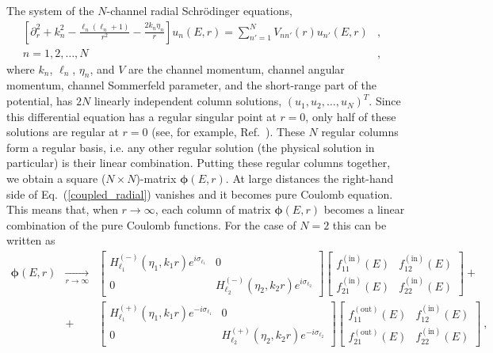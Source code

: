 \documentclass[12pt]{article}
\begin{document}
The system of the $N$-channel radial Schr\"odinger equations,
\begin{eqnarray}
\label{coupled_radial}
    \left[\partial^2_r+k_n^2-\frac{\ell_n(\ell_n+1)}{r^2}
    -\frac{2k_n\eta_n}{r}\right]
    u_{n}(E,r)
    =
    \sum_{n'=1}^NV_{nn'}(r)u_{n'}(E,r)&,&\\[3mm]
\nonumber
    n = 1,2,\dots,N &,&
\end{eqnarray}
where $k_n$, $\ell_n$, $\eta_n$, and $V$ are the channel momentum,
channel angular momentum, channel Sommerfeld parameter, and the
short-range part of the potential, has $2N$ linearly independent column
solutions, $(u_1,u_2,\dots,u_N)^T$. Since this differential equation has a
regular singular point at $r=0$, only half of these solutions are regular at
$r=0$ (see, for example, Ref.~\cite{Riley}). These $N$ regular columns form a
regular basis, i.e. any other
regular solution (the physical solution in particular) is their linear
combination. Putting  these regular columns together, we obtain a square
($N\times N$)-matrix $\boldsymbol{\phi}(E,r)$. At large distances the right-hand side
of Eq.~(\ref{coupled_radial}) vanishes and it becomes pure Coulomb equation.
This means that, when $r\to\infty$, each column of matrix $\bm{\phi}(E,r)$
becomes a linear combination of the pure Coulomb functions. For the case of
$N=2$ this can be written as
\begin{eqnarray}
\nonumber
  \bm{\phi}(E,r)
  &\mathop{\longrightarrow}\limits_{r\to\infty}&
  \begin{bmatrix}
  H_{\ell_1}^{(-)}(\eta_1,k_1r)e^{i\sigma_{\ell_1}} & 0\\[3mm]
  0 & H_{\ell_2}^{(-)}(\eta_2,k_2r)e^{i\sigma_{\ell_2}}
  \end{bmatrix}
  \begin{bmatrix}
  f_{11}^{\mathrm{(in)}}(E) & f_{12}^{\mathrm{(in)}}(E)\\[3mm]
  f_{21}^{\mathrm{(in)}}(E) & f_{22}^{\mathrm{(in)}}(E)
  \end{bmatrix}
  +\\[3mm]
\label{regular_ass}
  &+&
  \begin{bmatrix}
  H_{\ell_1}^{(+)}(\eta_1,k_1r)e^{-i\sigma_{\ell_1}} & 0\\[3mm]
  0 & H_{\ell_2}^{(+)}(\eta_2,k_2r)e^{-i\sigma_{\ell_2}}
  \end{bmatrix}
  \begin{bmatrix}
  f_{11}^{\mathrm{(out)}}(E) & f_{12}^{\mathrm{(in)}}(E)\\[3mm]
  f_{21}^{\mathrm{(out)}}(E) & f_{22}^{\mathrm{(in)}}(E)
  \end{bmatrix}\ ,
\end{eqnarray}
\end{document}
